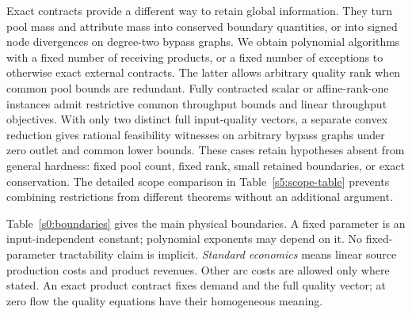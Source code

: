 Exact contracts provide a different way to retain global information.
They turn pool mass and attribute mass into conserved boundary quantities,
or into signed node divergences on degree-two bypass graphs. We obtain
polynomial algorithms with a fixed number of receiving products, or a
fixed number of exceptions to otherwise exact external contracts.
The latter allows arbitrary quality rank when common pool bounds are
redundant. Fully contracted scalar or affine-rank-one instances admit
restrictive common throughput bounds and linear throughput objectives.
With only two distinct full input-quality vectors, a separate convex
reduction gives rational feasibility witnesses on arbitrary bypass
graphs under zero outlet and common lower bounds. These cases retain
hypotheses absent from general hardness: fixed pool count, fixed rank,
small retained boundaries, or exact conservation. The detailed scope
comparison in Table~\ref{s5:scope-table} prevents combining restrictions
from different theorems without an additional argument.

Table~\ref{s0:boundaries} gives the main physical boundaries. A fixed
parameter is an input-independent constant; polynomial exponents may
depend on it. No fixed-parameter tractability claim is implicit.
\emph{Standard economics} means linear source production costs and
product revenues. Other arc costs are allowed only where stated.
An exact product contract fixes demand and the full quality vector;
at zero flow the quality equations have their homogeneous meaning.

